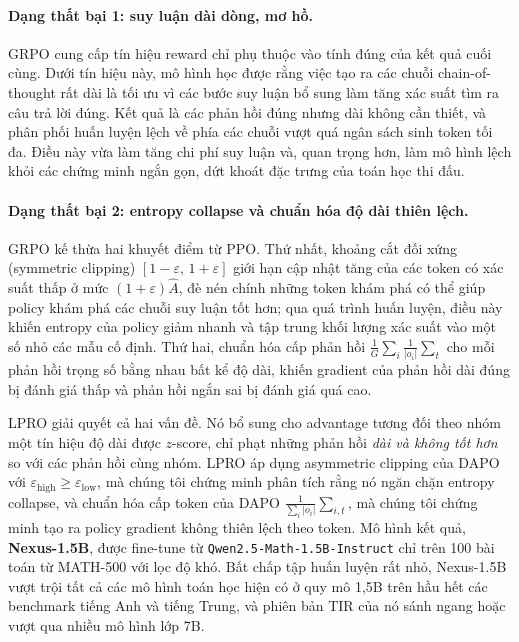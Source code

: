 \documentclass[11pt,a4paper]{article}
\begin{document}
\paragraph{Dạng thất bại 1: suy luận dài dòng, mơ hồ.} GRPO cung cấp tín hiệu reward
chỉ phụ thuộc vào tính đúng của kết quả cuối cùng. Dưới tín hiệu này, mô hình học được rằng
việc tạo ra các chuỗi chain-of-thought rất dài là tối ưu vì các bước suy luận bổ sung
làm tăng xác suất tìm ra câu trả lời đúng. Kết quả là các phản hồi đúng nhưng dài
không cần thiết, và phân phối huấn luyện lệch về phía các chuỗi vượt quá ngân sách
sinh token tối đa. Điều này vừa làm tăng chi phí suy luận và, quan trọng hơn,
làm mô hình lệch khỏi các chứng minh ngắn gọn, dứt khoát đặc trưng của toán học thi đấu.

\paragraph{Dạng thất bại 2: entropy collapse và chuẩn hóa độ dài thiên lệch.} GRPO
kế thừa hai khuyết điểm từ PPO. Thứ nhất, khoảng cắt đối xứng (symmetric clipping)
\([1-\varepsilon,\,1+\varepsilon]\) giới hạn cập nhật tăng của các token có xác suất thấp ở mức
\((1+\varepsilon)\hat{A}\), đè nén chính những token khám phá có thể giúp
policy khám phá các chuỗi suy luận tốt hơn; qua quá trình huấn luyện, điều này khiến entropy của policy
giảm nhanh và tập trung khối lượng xác suất vào một số nhỏ các mẫu cố định. Thứ hai, chuẩn hóa cấp phản hồi \(\tfrac{1}{G}\sum_{i}\tfrac{1}{|o_i|}\sum_t\) cho mỗi phản hồi trọng số bằng nhau bất kể độ dài, khiến gradient của phản hồi dài đúng bị đánh giá thấp và phản hồi ngắn sai bị đánh giá quá cao.

LPRO giải quyết cả hai vấn đề. Nó bổ sung cho advantage tương đối theo nhóm một
tín hiệu độ dài được \(z\)-score, chỉ phạt những phản hồi \emph{dài và không tốt hơn}
so với các phản hồi cùng nhóm. LPRO áp dụng asymmetric clipping của DAPO
với \(\varepsilon_{\text{high}}\!\ge\!\varepsilon_{\text{low}}\), mà chúng tôi chứng minh phân tích rằng nó ngăn chặn
entropy collapse, và chuẩn hóa cấp token của DAPO \(\tfrac{1}{\sum_i|o_i|}\sum_{i,t}\),
mà chúng tôi chứng minh tạo ra policy gradient không thiên lệch theo token. Mô hình kết quả,
\textbf{Nexus-1.5B}, được fine-tune từ \texttt{Qwen2.5-Math-1.5B-Instruct} chỉ trên
100 bài toán từ MATH-500 với lọc độ khó. Bất chấp tập huấn luyện rất nhỏ,
Nexus-1.5B vượt trội tất cả các mô hình toán học hiện có ở quy mô 1,5B trên hầu hết
các benchmark tiếng Anh và tiếng Trung, và phiên bản TIR của nó sánh ngang hoặc vượt qua
nhiều mô hình lớp 7B.
\end{document}
